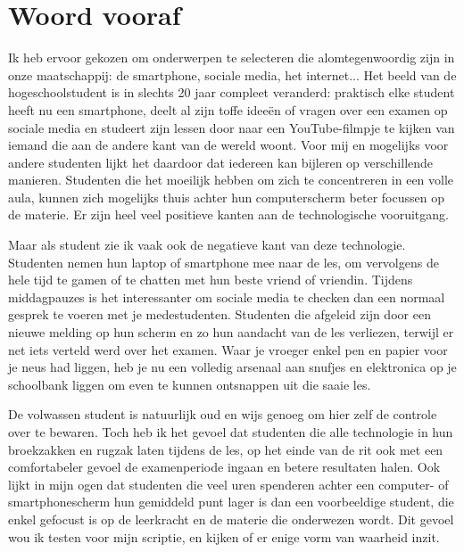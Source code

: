 
\chapter*{Woord vooraf}
\label{ch:voorwoord}

Ik heb ervoor gekozen om onderwerpen te selecteren die alomtegenwoordig zijn in onze maatschappij: de smartphone, sociale media, het internet... Het beeld van de hogeschoolstudent is in slechts 20 jaar compleet veranderd: praktisch elke student heeft nu een smartphone, deelt al zijn toffe ideeën of vragen over een examen op sociale media en studeert zijn lessen door naar een YouTube-filmpje te kijken van iemand die aan de andere kant van de wereld woont. Voor mij en mogelijks voor andere studenten lijkt het daardoor dat iedereen kan bijleren op verschillende manieren. Studenten die het moeilijk hebben om zich te concentreren in een volle aula, kunnen zich mogelijks thuis achter hun computerscherm beter focussen op de materie. Er zijn heel veel positieve kanten aan de technologische vooruitgang.

Maar als student zie ik vaak ook de negatieve kant van deze technologie. Studenten nemen hun laptop of smartphone mee naar de les, om vervolgens de hele tijd te gamen of te chatten met hun beste vriend of vriendin. Tijdens middagpauzes is het interessanter om sociale media te checken dan een normaal gesprek te voeren met je medestudenten. Studenten die afgeleid zijn door een nieuwe melding op hun scherm en zo hun aandacht van de les verliezen, terwijl er net iets verteld werd over het examen. Waar je vroeger enkel pen en papier voor je neus had liggen, heb je nu een volledig arsenaal aan snufjes en elektronica op je schoolbank liggen om even te kunnen ontsnappen uit die saaie les.

De volwassen student is natuurlijk oud en wijs genoeg om hier zelf de controle over te bewaren. Toch heb ik het gevoel dat studenten die alle technologie in hun broekzakken en rugzak laten tijdens de les, op het einde van de rit ook met een comfortabeler gevoel de examenperiode ingaan en betere resultaten halen. Ook lijkt in mijn ogen dat studenten die veel uren spenderen achter een computer- of smartphonescherm hun gemiddeld punt lager is dan een voorbeeldige student, die enkel gefocust is op de leerkracht en de materie die onderwezen wordt. Dit gevoel wou ik testen voor mijn scriptie, en kijken of er enige vorm van waarheid inzit.

